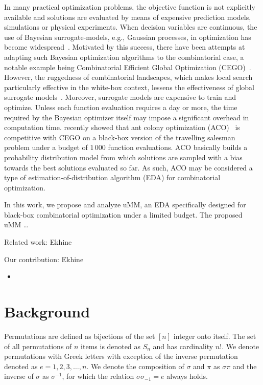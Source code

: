 \documentclass[runningheads]{llncs}
\begin{document}
In many practical optimization problems, the objective function is not
explicitly available and solutions are evaluated by means of expensive
prediction models, simulations or physical experiments. When decision variables
are continuous, the use of Bayesian surrogate-models, e.g., Gaussian processes,
in optimization has become
widespread~\citep{JonSchWel98go,ForKea2009surrogate}. Motivated by this
success, there have been attempts at adapting such Bayesian optimization
algorithms to the combinatorial case, a notable example being Combinatorial
Efficient Global Optimization
(CEGO)~\citep{ZaeStoBar2014:ppsn,ZaeStoFriFisNauBar2014}. However, the
ruggedness of combinatorial landscapes, which makes local search particularly
effective in the white-box context, lessens the effectiveness of global
surrogate models~\citep{EriPeaGar2019scalable}. Moreover, surrogate models are
expensive to train and optimize. Unless each function evaluation requires a day
or more, the time required by the Bayesian optimizer itself may impose a
significant overhead in computation time. \citet{PerLopStu2015si} recently
showed that ant colony optimization (ACO)~\citep{DorStu2004:book} is
competitive with CEGO on a black-box version of the travelling salesman problem
under a budget of $1\,000$ function evaluations. ACO basically builds a
probability distribution model from which solutions are sampled with a bias
towards the best solutions evaluated so far. As such, ACO may be considered a
type of estimation-of-distribution algorithm (EDA) for combinatorial
optimization.

In this work, we propose and analyze uMM, an EDA specifically designed for
black-box combinatorial optimization under a limited budget. The proposed uMM \ldots{}
\


Related work: Ekhine

Our contribution: Ekhine
\begin{itemize}
\item 
\end{itemize}


\citep{LopDubPerStuBir2016irace}

\section{Background}\label{sec:backgroud}

Permutations are defined as bijections of the set $[n]$ integer onto itself. The set of all permutations of $n$ items is denoted as $S_n$ and has cardinality $n!$. We denote permutations with Greek letters with exception of the inverse permutation denoted as $e=1, 2, 3, \ldots,n$. We denote the composition of $\sigma$ and $\pi$ as $\sigma\pi$ and the inverse of $\sigma$ as $\sigma^{-1}$, for which the relation $\sigma\sigma_{-1}=e$ always holds. 
\end{document}
